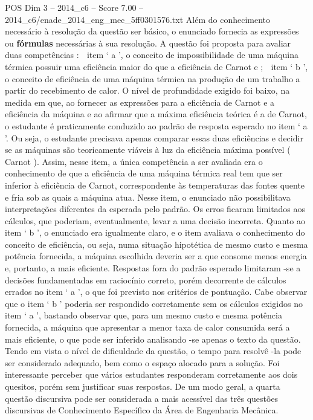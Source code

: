\begin{textsample}{POS Dim 3 – 2014\_c6 – Score 7.00 – 2014\_c6/enade\_2014\_eng\_mec\_5ff0301576.txt}
Além do conhecimento necessário à resolução da questão ser básico, o enunciado fornecia as expressões ou \textbf{fórmulas} necessárias à sua resolução.
A questão foi proposta para avaliar duas competências :  item ‘ a ’, o conceito de impossibilidade de uma máquina térmica possuir uma eficiência maior do que a eficiência de Carnot e ;  item ‘ b ’, o conceito de eficiência de uma máquina térmica na produção de um trabalho a partir do recebimento de calor.
O nível de profundidade exigido foi baixo, na medida em que, ao fornecer as expressões para a eficiência de Carnot e a eficiência da máquina e ao afirmar que a máxima eficiência teórica é a de Carnot, o estudante é praticamente conduzido ao padrão de resposta esperado no item ‘ a ’.
Ou seja, o estudante precisava apenas comparar essas duas eficiências e decidir se as máquinas são teoricamente viáveis à luz da eficiência máxima possível ( Carnot ).
Assim, nesse item, a única competência a ser avaliada era o conhecimento de que a eficiência de uma máquina térmica real tem que ser inferior à eficiência de Carnot, correspondente às temperaturas das fontes quente e fria sob as quais a máquina atua.
Nesse item, o enunciado não possibilitava interpretações diferentes da esperada pelo padrão.
Os erros ficaram limitados aos cálculos, que poderiam, eventualmente, levar a uma decisão incorreta.
Quanto ao item ‘ b ’, o enunciado era igualmente claro, e o item avaliava o conhecimento do conceito de eficiência, ou seja, numa situação hipotética de mesmo custo e mesma potência fornecida, a máquina escolhida deveria ser a que consome menos energia e, portanto, a mais eficiente.
Respostas fora do padrão esperado limitaram -se a decisões fundamentadas em raciocínio correto, porém decorrente de cálculos errados no item ‘ a ’, o que foi previsto nos critérios de pontuação.
Cabe observar que o item ‘ b ’ poderia ser respondido corretamente sem os cálculos exigidos no item ‘ a ’, bastando observar que, para um mesmo custo e mesma potência fornecida, a máquina que apresentar a menor taxa de calor consumida será a mais eficiente, o que pode ser inferido analisando -se apenas o texto da questão.
Tendo em vista o nível de dificuldade da questão, o tempo para resolvê -la pode ser considerado adequado, bem como o espaço alocado para a solução.
Foi interessante perceber que vários estudantes responderam corretamente aos dois quesitos, porém sem justificar suas respostas.
De um modo geral, a quarta questão discursiva pode ser considerada a mais acessível das três questões discursivas de Conhecimento Específico da Área de Engenharia Mecânica.

\end{textsample}
